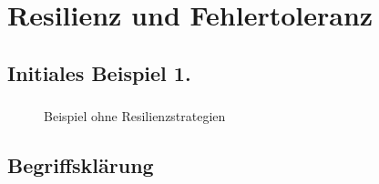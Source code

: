 %

\section{Resilienz und Fehlertoleranz}

\subsection{Initiales Beispiel 1.}

\begin{frame}
    \frametitle{\insertsection}
    \framesubtitle{\insertsubsection}
    \vspace*{-14pt}
    \begin{figure}[h]
        \centering
		\resizebox{!}{.7\textheight}{%
			
		}
		\captionsetup{aboveskip=2pt}
        \caption{Beispiel ohne Resilienzstrategien}
    \end{figure}
%    
    

\end{frame}

\subsection{Begriffsklärung}

